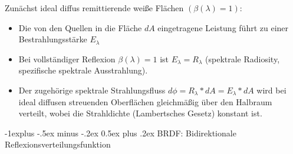 \documentclass[10pt,landscape]{article}
\makeatletter
\renewcommand{\subsection}{\@startsection{subsection}{2}{0mm}%
                                {-1explus -.5ex minus -.2ex}%
                                {0.5ex plus .2ex}%
                                {\normalfont\normalsize\bfseries}}
\makeatother
\begin{document}
\begin{multicols}{3}
Zunächst ideal diffus remittierende weiße Flächen $(\beta(\lambda) = 1)$:
\begin{itemize}
  \item Die von den Quellen in die Fläche $dA$ eingetragene Leistung führt zu einer Bestrahlungsstärke $E_{\lambda}$
  \item Bei vollständiger Reflexion $\beta(\lambda) = 1$ ist $E_{\lambda} = R_{\lambda}$ (spektrale Radiosity, spezifische spektrale Ausstrahlung).
  \item Der zugehörige spektrale Strahlungsfluss $d\phi = R_{\lambda} * dA = E_{\lambda} * dA$ wird bei ideal diffusen streuenden Oberflächen gleichmäßig über den Halbraum verteilt, wobei die Strahldichte (Lambertsches Gesetz) konstant ist.
\end{itemize}


\subsection{ BRDF: Bidirektionale Reflexionsverteilungsfunktion}

\end{multicols}
\end{document}
